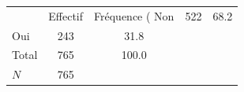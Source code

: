 {
\def\sym#1{\ifmmode^{#1}\else\(^{#1}\)\fi}
\begin{tabular}{l*{1}{cc}}
\toprule
            &    Effectif&Fréquence (%
\midrule
Non         &         522&        68.2\\
Oui         &         243&        31.8\\
Total       &         765&       100.0\\
\midrule
\(N\)       &         765&            \\
\bottomrule
\end{tabular}
}
